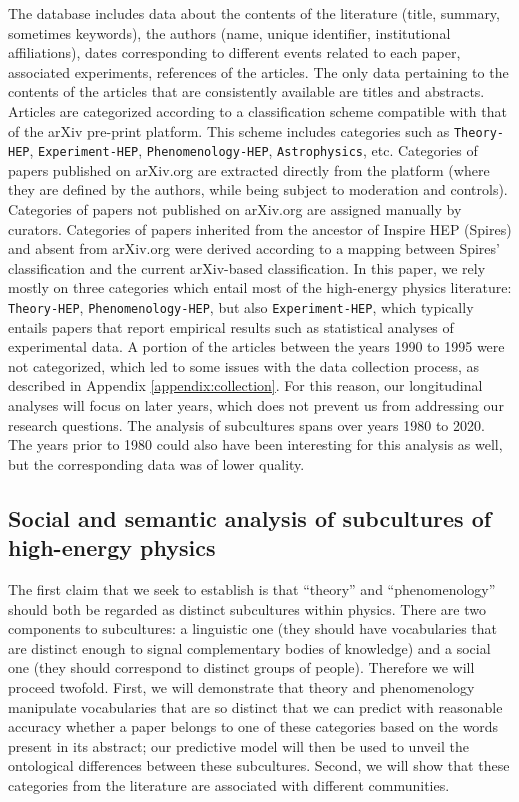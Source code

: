 \documentclass[smallextended]{svjour3}
\begin{document}
The database includes data about the contents of the literature (title, summary, sometimes keywords), the authors (name, unique identifier, institutional affiliations), dates corresponding to different events related to each paper, associated experiments, references of the articles. The only data pertaining to the contents of the articles that are consistently available are titles and abstracts. Articles are categorized according to a classification scheme compatible with that of the arXiv pre-print platform. This scheme includes categories such as \texttt{Theory-HEP}, \texttt{Experiment-HEP}, \texttt{Phenomenology-HEP}, \texttt{Astrophysics}, etc. Categories of papers published on arXiv.org are extracted directly from the platform (where they are defined by the authors, while being subject  to moderation and controls). Categories of papers not published on arXiv.org are assigned manually by curators. Categories of papers inherited from the ancestor of Inspire HEP (Spires) and absent from arXiv.org were derived according to a mapping between Spires' classification and the current arXiv-based classification. In this paper, we rely mostly on three categories which entail most of the high-energy physics literature: \texttt{Theory-HEP}, \texttt{Phenomenology-HEP}, but also \texttt{Experiment-HEP}, which typically entails papers that report empirical results such as statistical analyses of experimental data. A portion of the articles between the years 1990 to 1995 were not categorized, which led to some issues with the data collection process, as described in Appendix \ref{appendix:collection}. For this reason, our longitudinal analyses will focus on later years, which does not prevent us from addressing our research questions. The analysis of subcultures spans over years 1980 to 2020. The years prior to 1980 could also have been interesting for this analysis as well, but the corresponding data was of lower quality.


\subsection{Social and semantic analysis of subcultures of high-energy physics}\label{section:method_subcultures}

The first claim that we seek to establish is that ``theory'' and ``phenomenology'' should both be regarded as distinct subcultures within physics. There are two components to subcultures: a linguistic one (they should have vocabularies that are distinct enough to signal complementary bodies of knowledge) and a social one (they should correspond to distinct groups of people). Therefore we will proceed twofold. First, we will demonstrate that theory and phenomenology manipulate vocabularies that are so distinct that we can predict with reasonable accuracy whether a paper belongs to one of these categories based on the words present in its abstract; our predictive model will then be used to unveil the ontological differences between these subcultures. Second, we will show that these categories from the literature are associated with different communities.
\end{document}
